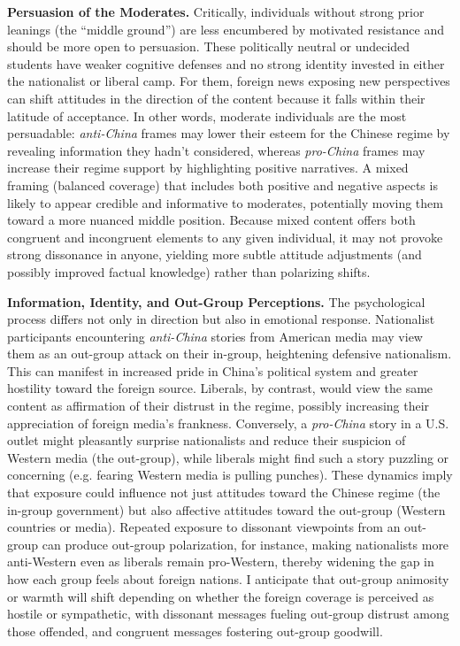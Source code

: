 \documentclass[12pt, american]{article}
\begin{document}
\textbf{Persuasion of the Moderates.}  Critically, individuals without strong prior leanings (the “middle ground”) are less encumbered by motivated resistance and should be more open to persuasion. These politically neutral or undecided students have weaker cognitive defenses and no strong identity invested in either the nationalist or liberal camp. For them, foreign news exposing new perspectives can shift attitudes in the direction of the content because it falls within their latitude of acceptance. In other words, moderate individuals are the most persuadable: \textit{anti-China} frames may lower their esteem for the Chinese regime by revealing information they hadn’t considered, whereas \textit{pro-China} frames may increase their regime support by highlighting positive narratives. A mixed framing (balanced coverage) that includes both positive and negative aspects is likely to appear credible and informative to moderates, potentially moving them toward a more nuanced middle position. Because mixed content offers both congruent and incongruent elements to any given individual, it may not provoke strong dissonance in anyone, yielding more subtle attitude adjustments (and possibly improved factual knowledge) rather than polarizing shifts.

\textbf{Information, Identity, and Out-Group Perceptions.}  The psychological process differs not only in direction but also in emotional response. Nationalist participants encountering \textit{anti-China} stories from American media may view them as an out-group attack on their in-group, heightening defensive nationalism. This can manifest in increased pride in China’s political system and greater hostility toward the foreign source. Liberals, by contrast, would view the same content as affirmation of their distrust in the regime, possibly increasing their appreciation of foreign media’s frankness. Conversely, a \textit{pro-China} story in a U.S. outlet might pleasantly surprise nationalists and reduce their suspicion of Western media (the out-group), while liberals might find such a story puzzling or concerning (e.g. fearing Western media is pulling punches). These dynamics imply that exposure could influence not just attitudes toward the Chinese regime (the in-group government) but also affective attitudes toward the out-group (Western countries or media). Repeated exposure to dissonant viewpoints from an out-group can produce out-group polarization, for instance, making nationalists more anti-Western even as liberals remain pro-Western, thereby widening the gap in how each group feels about foreign nations. I anticipate that out-group animosity or warmth will shift depending on whether the foreign coverage is perceived as hostile or sympathetic, with dissonant messages fueling out-group distrust among those offended, and congruent messages fostering out-group goodwill.
\end{document}
